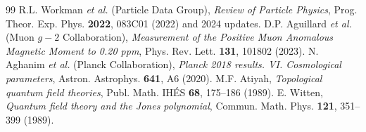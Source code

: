 \documentclass[11pt, a4paper]{article}
\begin{document}
\begin{thebibliography}{99}
 R.L. Workman \textit{et al.} (Particle Data Group), \textit{Review of Particle Physics}, Prog. Theor. Exp. Phys. \textbf{2022}, 083C01 (2022) and 2024 updates.
 D.P. Aguillard \textit{et al.} (Muon $g-2$ Collaboration), \textit{Measurement of the Positive Muon Anomalous Magnetic Moment to 0.20 ppm}, Phys. Rev. Lett. \textbf{131}, 101802 (2023).
 N. Aghanim \textit{et al.} (Planck Collaboration), \textit{Planck 2018 results. VI. Cosmological parameters}, Astron. Astrophys. \textbf{641}, A6 (2020).
 M.F. Atiyah, \textit{Topological quantum field theories}, Publ. Math. IHÉS \textbf{68}, 175--186 (1989).
 E. Witten, \textit{Quantum field theory and the Jones polynomial}, Commun. Math. Phys. \textbf{121}, 351--399 (1989).
\end{thebibliography}
\end{document}
